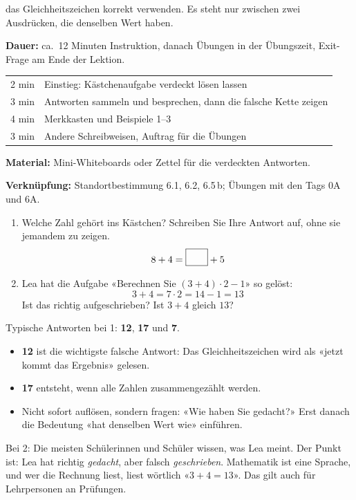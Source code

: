 \documentclass[11pt]{exam}
\begin{document}
  {das Gleichheitszeichen korrekt verwenden. Es steht nur zwischen zwei
   Ausdrücken, die denselben Wert haben.}

\begin{lehrperson}[Ablauf]
\textbf{Dauer:} ca.\ 12 Minuten Instruktion, danach Übungen in der Übungszeit,
Exit-Frage am Ende der Lektion.

\begin{tabular}{@{}ll@{}}
  2 min & Einstieg: Kästchenaufgabe verdeckt lösen lassen \\
  3 min & Antworten sammeln und besprechen, dann die falsche Kette zeigen \\
  4 min & Merkkasten und Beispiele 1–3 \\
  3 min & Andere Schreibweisen, Auftrag für die Übungen
\end{tabular}

\textbf{Material:} Mini-Whiteboards oder Zettel für die verdeckten Antworten.

\textbf{Verknüpfung:} Standortbestimmung 6.1, 6.2, 6.5\,b; Übungen mit den
Tags 0A und 6A.
\end{lehrperson}


\begin{einstieg}
\begin{enumerate}
  \item Welche Zahl gehört ins Kästchen? Schreiben Sie Ihre Antwort auf, ohne
        sie jemandem zu zeigen.
        \[ 8 + 4 = \kaestchen + 5 \]
  \item Lea hat die Aufgabe «Berechnen Sie $(3 + 4) \cdot 2 - 1$» so gelöst:
        \[ 3 + 4 = 7 \cdot 2 = 14 - 1 = 13 \]
        Ist das richtig aufgeschrieben? Ist $3 + 4$ gleich $13$?
\end{enumerate}
\end{einstieg}

\begin{lehrperson}[Einstieg]
Typische Antworten bei 1: \textbf{12}, \textbf{17} und \textbf{7}.
\begin{itemize}
  \item \textbf{12} ist die wichtigste falsche Antwort: Das Gleichheitszeichen
        wird als «jetzt kommt das Ergebnis» gelesen.
  \item \textbf{17} entsteht, wenn alle Zahlen zusammengezählt werden.
  \item Nicht sofort auflösen, sondern fragen: «Wie haben Sie gedacht?» Erst
        danach die Bedeutung «hat denselben Wert wie» einführen.
\end{itemize}
Bei 2: Die meisten Schülerinnen und Schüler wissen, was Lea meint. Der Punkt
ist: Lea hat richtig \emph{gedacht}, aber falsch \emph{geschrieben}. Mathematik
ist eine Sprache, und wer die Rechnung liest, liest wörtlich
«$3 + 4 = 13$». Das gilt auch für Lehrpersonen an Prüfungen.
\end{lehrperson}
\end{document}
